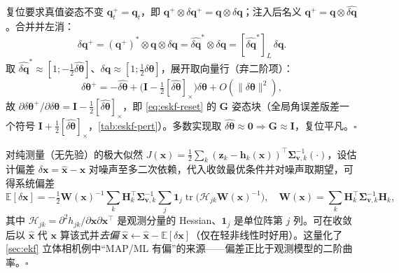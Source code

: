 \begin{derivation}
复位要求真值姿态不变 $\mathbf{q}_t^+=\mathbf{q}_t$，即 $\mathbf{q}^+\otimes\delta\mathbf{q}^+=\mathbf{q}\otimes\delta\mathbf{q}$；注入后名义 $\mathbf{q}^+=\mathbf{q}\otimes\widehat{\delta\mathbf{q}}$。合并并左消：
\[
  \delta\mathbf{q}^+=(\mathbf{q}^+)^*\otimes\mathbf{q}\otimes\delta\mathbf{q}=\widehat{\delta\mathbf{q}}^*\otimes\delta\mathbf{q}=[\widehat{\delta\mathbf{q}}^*]_L\,\delta\mathbf{q}.
\]
取 $\widehat{\delta\mathbf{q}}^*\approx[1;-\tfrac12\widehat{\delta\boldsymbol{\theta}}]$、$\delta\mathbf{q}\approx[1;\tfrac12\delta\boldsymbol{\theta}]$，展开取向量行（弃二阶项）：
\[
  \delta\boldsymbol{\theta}^+=-\widehat{\delta\boldsymbol{\theta}}+\Big(\mathbf{I}-\tfrac12[\widehat{\delta\boldsymbol{\theta}}]_\times\Big)\delta\boldsymbol{\theta}+O(\|\delta\boldsymbol{\theta}\|^2),
\]
故 $\partial\delta\boldsymbol{\theta}^+/\partial\delta\boldsymbol{\theta}=\mathbf{I}-\tfrac12[\widehat{\delta\boldsymbol{\theta}}]_\times$，即 \cref{eq:eskf-reset} 的 $\mathbf{G}$ 姿态块\cite{sola2017quaternion}（全局角误差版差一个符号 $\mathbf{I}+\tfrac12[\widehat{\delta\boldsymbol{\theta}}]_\times$，\cref{tab:eskf-pert}）。多数实现取 $\widehat{\delta\boldsymbol{\theta}}\approx\mathbf{0}\Rightarrow\mathbf{G}\approx\mathbf{I}$，复位平凡。\hfill$\square$
\end{derivation}

\begin{derivation}[（选读）ML 偏差的近似闭式]
对纯测量（无先验）的极大似然 $J(\mathbf{x})=\tfrac12\sum_k(\mathbf{z}_k-\mathbf{h}_k(\mathbf{x}))^\top\boldsymbol{\Sigma}_{\mathbf{v},k}^{-1}(\cdot)$，设估计偏差 $\delta\mathbf{x}=\hat{\mathbf{x}}-\mathbf{x}$ 对噪声至多二次依赖，代入收敛最优条件并对噪声取期望，可得系统偏差\cite{barfoot2024state}
\[
  \mathbb{E}[\delta\mathbf{x}]=-\tfrac12\mathbf{W}(\mathbf{x})^{-1}\sum_k\mathbf{H}_k^\top\boldsymbol{\Sigma}_{\mathbf{v},k}^{-1}\sum_j\mathbf{1}_j\operatorname{tr}\!\big(\boldsymbol{\mathcal{H}}_{jk}\mathbf{W}(\mathbf{x})^{-1}\big),\quad
  \mathbf{W}(\mathbf{x})=\sum_k\mathbf{H}_k^\top\boldsymbol{\Sigma}_{\mathbf{v},k}^{-1}\mathbf{H}_k,
\]
其中 $\boldsymbol{\mathcal{H}}_{jk}=\partial^2 h_{jk}/\partial\mathbf{x}\partial\mathbf{x}^\top$ 是观测分量的 Hessian、$\mathbf{1}_j$ 是单位阵第 $j$ 列。可在收敛后以 $\hat{\mathbf{x}}$ 代 $\mathbf{x}$ 算该式并\emph{去偏} $\hat{\mathbf{x}}\leftarrow\hat{\mathbf{x}}-\mathbb{E}[\delta\mathbf{x}]$（仅在轻非线性时好用）。这量化了 \cref{sec:ekf} 立体相机例中“MAP/ML 有偏”的来源——偏差正比于观测模型的二阶曲率。\hfill$\square$
\end{derivation}
